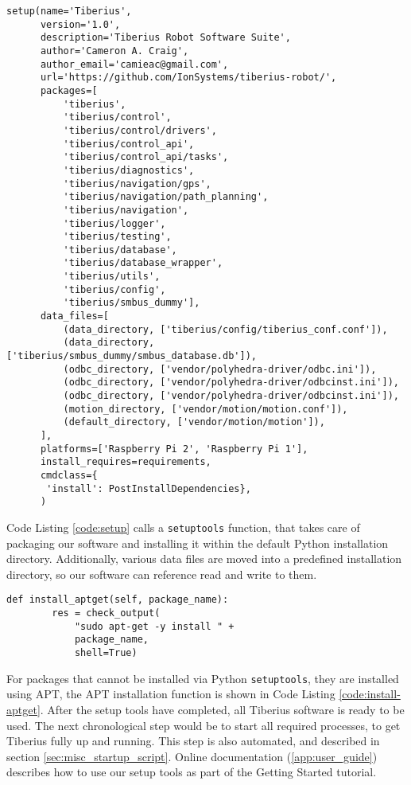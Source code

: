 \begin{lstlisting}[style=custompython,label=code:setup,caption=Python setuptools function call]
setup(name='Tiberius',
      version='1.0',
      description='Tiberius Robot Software Suite',
      author='Cameron A. Craig',
      author_email='camieac@gmail.com',
      url='https://github.com/IonSystems/tiberius-robot/',
      packages=[
          'tiberius',
          'tiberius/control',
          'tiberius/control/drivers',
          'tiberius/control_api',
          'tiberius/control_api/tasks',
          'tiberius/diagnostics',
          'tiberius/navigation/gps',
          'tiberius/navigation/path_planning',
          'tiberius/navigation',
          'tiberius/logger',
          'tiberius/testing',
          'tiberius/database',
          'tiberius/database_wrapper',
          'tiberius/utils',
          'tiberius/config',
          'tiberius/smbus_dummy'],
      data_files=[
          (data_directory, ['tiberius/config/tiberius_conf.conf']),
          (data_directory, ['tiberius/smbus_dummy/smbus_database.db']),
          (odbc_directory, ['vendor/polyhedra-driver/odbc.ini']),
          (odbc_directory, ['vendor/polyhedra-driver/odbcinst.ini']),
          (odbc_directory, ['vendor/polyhedra-driver/odbcinst.ini']),
          (motion_directory, ['vendor/motion/motion.conf']),
          (default_directory, ['vendor/motion/motion']),
      ],
      platforms=['Raspberry Pi 2', 'Raspberry Pi 1'],
      install_requires=requirements,
      cmdclass={
       'install': PostInstallDependencies},
      )
\end{lstlisting}
\noindent
Code Listing \ref{code:setup} calls a \texttt{setuptools} function, that takes care of packaging our software and installing it within the default Python installation directory. Additionally, various data files are moved into a predefined installation directory, so our software can reference read and write to them.

\begin{lstlisting}[style=custompython,label=code:install-aptget,caption=Advanced packaging tool install function]
def install_aptget(self, package_name):
        res = check_output(
            "sudo apt-get -y install " +
            package_name,
            shell=True)
\end{lstlisting}
\noindent
For packages that cannot be installed via Python \texttt{setuptools}, they are installed using \gls{APT}, the \gls{APT} installation function is shown in Code Listing \ref{code:install-aptget}.
\newline
After the setup tools have completed, all Tiberius software is ready to be used. The next chronological step would be to start all required processes, to get Tiberius fully up and running. This step is also automated, and described in section \ref{sec:misc_startup_script}. Online documentation (\ref{app:user_guide}) describes how to use our setup tools as part of the Getting Started tutorial.

